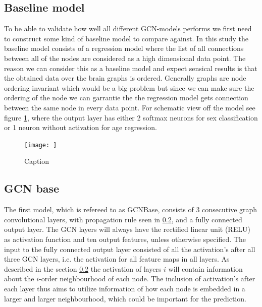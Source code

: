 \subsection{Baseline model}
To be able to validate how well all different GCN-models performs we first need to construct some kind of baseline model to compare against. In this study the baseline model consists of a regression model where the list of all connections between all of the nodes are considered as a high dimensional data point. The reason we can consider this as a baseline model and  expect sensical results is that the obtained data over the brain graphs is ordered. Generally graphs are node ordering invariant which would be a big problem but since we can make sure the ordering of the node we can garrantie the the regression model gets connection between the same node in every data point. For schematic view off the model see figure \ref{fig:Graph_class_baseline}, where the output layer has either 2 softmax neurons for sex classification or 1 neuron without activation for age regression. 
\begin{figure}
    \centering
    \texttt{[image: ]}
    \caption{Caption}
    \label{fig:Graph_class_baseline}
\end{figure}

\subsection{GCN base}
The first model, which is refereed to as GCNBase, consists of 3 consecutive graph convolutional layers, with propagation rule seen in \ref{}, and a fully connected output layer. The GCN layers will always have the rectified linear unit (RELU) as activation function and ten output features, unless otherwise specified. The input to the fully connected output layer consisted of all the activation's after all three GCN layers, i.e. the activation for all feature maps in all layers. As described in the section \ref{} the activation of layers $i$ will contain information about the $i$-order neighbourhood of each node. The inclusion of activation's after each layer thus aims to utilize information of how each node is embedded in a larger and larger neighbourhood, which could be important for the prediction.


